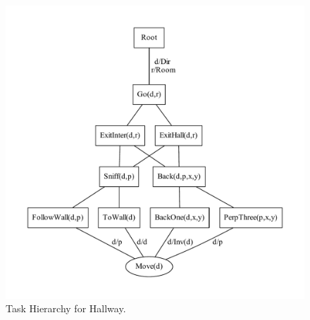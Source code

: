 \begin{figure}
\centerline{\includegraphics[scale=0.5]{task/Hallway-Hierarchy.pdf}}
\vspace{-0.3in}\caption{Task Hierarchy for {\sf Hallway}.}\label{fig:hallway}
\vspace{-0.2in}\end{figure}

